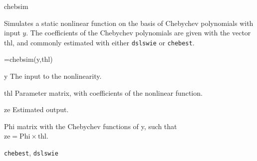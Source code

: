 \documentclass{book}
\newcommand{\chebest}{\texttt{chebest}}
\newcommand{\dslswie}{\texttt{dslswie}}
\begin{document}
\begin{command}{chebsim}
\begin{purpose}
  Simulates a static nonlinear function on the basis of Chebychev
  polynomials with input $y$. The coefficients of the Chebychev
  polynomials are given with the vector thl, and commonly estimated
  with either {\dslswie} or {\chebest}.
\end{purpose}

\begin{syntax}
[ze,Phi]=chebsim(y,thl)
\end{syntax}
\begin{inputs}
\item[y] The input to the nonlinearity.
\item[thl] Parameter matrix, with coefficients of the nonlinear
  function.
\end{inputs}

\begin{outputs}
\item[ze] Estimated output.
\item[Phi] matrix with the Chebychev functions of y, such that\\
 $\mbox{ze}=\mbox{Phi}\times\mbox{thl}$.
\end{outputs}

\begin{seealso}
  {\chebest}, {\dslswie}
\end{seealso}
\end{command}%
\end{document}
